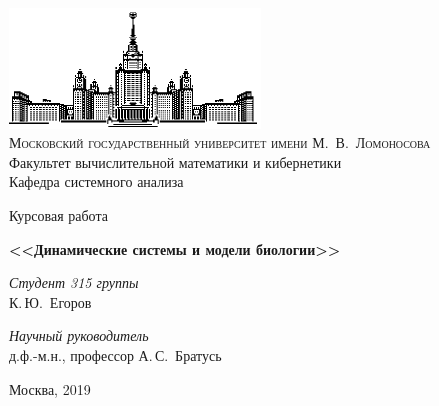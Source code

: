 \thispagestyle{empty}
\begin{center}
    \ \vspace{-3cm}

    \includegraphics[width=0.5\textwidth]{title_page/msu.eps}\\

    {\scshape Московский государственный университет имени М.~В.~Ломоносова}\\
    Факультет вычислительной математики и кибернетики\\
    Кафедра системного анализа

    \vfill

    {\LARGE Курсовая работа}

    \vspace{1cm}

    {\Huge\bfseries <<Динамические системы и модели биологии>>}
\end{center}

\vspace{3cm}

\begin{flushright}
    \large
    \textit{Студент 315 группы}\\
    К.\,Ю.~Егоров

    \vspace{5mm}

    \textit{Научный руководитель}\\
    д.ф.-м.н., профессор А.\,С.~Братусь
\end{flushright}

\vfill

\begin{center}
    Москва, 2019
\end{center}

\clearpage